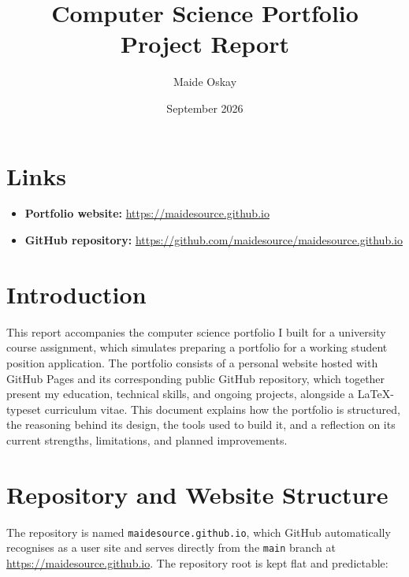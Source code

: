 \documentclass[11pt,a4paper]{article}
\title{\vspace{-1cm}\textbf{Computer Science Portfolio}\\[4pt]\large Project Report}
\author{Maide Oskay}
\date{September 2026}
\begin{document}
\maketitle
\vspace{-0.5cm}

\section*{Links}
\begin{itemize}[leftmargin=1.2cm]
  \item \textbf{Portfolio website:} \url{https://maidesource.github.io}
  \item \textbf{GitHub repository:} \url{https://github.com/maidesource/maidesource.github.io}
\end{itemize}

\section{Introduction}
This report accompanies the computer science portfolio I built for a university course
assignment, which simulates preparing a portfolio for a working student position application.
The portfolio consists of a personal website hosted with GitHub Pages
and its corresponding public GitHub repository, which together present my education, technical
skills, and ongoing projects, alongside a LaTeX-typeset curriculum vitae. This document explains
how the portfolio is structured, the reasoning behind its design, the tools used to build it, and
a reflection on its current strengths, limitations, and planned improvements.

\section{Repository and Website Structure}
The repository is named \texttt{maidesource.github.io}, which GitHub automatically recognises as
a user site and serves directly from the \texttt{main} branch at
\url{https://maidesource.github.io}. The repository root is kept flat and predictable:
\end{document}
